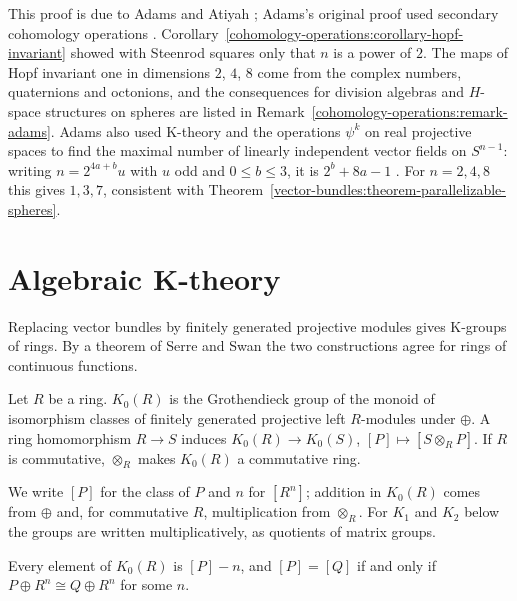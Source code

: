 \begin{remark}\label{k-theory:remark-hopf-consequences}
This proof is due to Adams and Atiyah \cite{adams-atiyah-1966}; Adams's original proof used secondary cohomology operations \cite{adams-1960}. Corollary~\ref{cohomology-operations:corollary-hopf-invariant}
showed with Steenrod squares only that $n$ is a power of $2$. The maps of Hopf invariant one in dimensions $2$, $4$, $8$ come from the complex numbers, quaternions and octonions, and the consequences for
division algebras and $H$-space structures on spheres are listed in Remark~\ref{cohomology-operations:remark-adams}. Adams also used K-theory and the operations $\psi^k$ on real projective spaces to find the
maximal number of linearly independent vector fields on $S^{n-1}$: writing $n = 2^{4a+b}u$ with $u$ odd and $0 \leq b \leq 3$, it is $2^b + 8a - 1$ \cite{adams-1962}. For $n = 2, 4, 8$ this gives $1, 3, 7$,
consistent with Theorem~\ref{vector-bundles:theorem-parallelizable-spheres}.
\end{remark}

\section{Algebraic K-theory}\label{k-theory:section-algebraic-k-theory}

Replacing vector bundles by finitely generated projective modules gives K-groups of rings. By a theorem of Serre and Swan the two constructions agree for rings of continuous functions.

\begin{definition}\label{k-theory:definition-k-zero}
Let $R$ be a ring. $K_0(R)$ is the Grothendieck group of the monoid of isomorphism classes of finitely generated projective left $R$-modules under $\oplus$. A ring homomorphism $R \to S$ induces
$K_0(R) \to K_0(S)$, $[P] \mapsto [S \otimes_RP]$. If $R$ is commutative, $\otimes_R$ makes $K_0(R)$ a commutative ring.
\end{definition}

\begin{notation}\label{k-theory:notation-algebraic}
We write $[P]$ for the class of $P$ and $n$ for $[R^n]$; addition in $K_0(R)$ comes from $\oplus$ and, for commutative $R$, multiplication from $\otimes_R$. For $K_1$ and $K_2$ below the groups are written
multiplicatively, as quotients of matrix groups.
\end{notation}

\begin{proposition}\label{k-theory:proposition-k-zero-elements}
Every element of $K_0(R)$ is $[P] - n$, and $[P] = [Q]$ if and only if $P \oplus R^n \cong Q \oplus R^n$ for some $n$.
\end{proposition}

